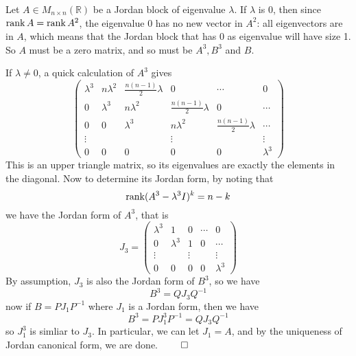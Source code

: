 \begin{enumerate}
    Let $A \in M_{n\times n}(\mathbb{R})$ be a Jordan block of eigenvalue $\lambda$. 
    If $\lambda$ is $0$, then since $\operatorname{rank} A = \operatorname{rank} A^2$, the eigenvalue 0 has no new vector in $A^2$: all eigenvectors are in $A$, which means that the Jordan block that has 0 as eigenvalue will have size 1. So $A$ must be a zero matrix, and so must be $A^3, B^3$ and $B$.

    If $\lambda \neq 0$, a quick calculation of $A^3$ gives 
    \[
    \begin{pmatrix}
        \lambda^3 & n \lambda^2 & \frac{n(n-1)}{2} \lambda & 0 & \cdots & 0  \\
        0 & \lambda^3 & n \lambda^2 & \frac{n(n-1)}{2} \lambda & 0 & \cdots   \\
        0 & 0 & \lambda^3 & n \lambda^2 & \frac{n(n-1)}{2} \lambda &  \cdots   \\
        \vdots & & &\vdots & & \vdots \\
        0 & 0& 0& 0& 0& \lambda^3 
    \end{pmatrix}	
    \]
    This is an upper triangle matrix, so its eigenvalues are exactly the elements in the diagonal. Now to determine its Jordan form, by noting that 
    \[
    \operatorname{rank} (A^3 - \lambda^3I)^k = n - k	
    \]
    we have the Jordan form of $A^3$, that is 
    \[ J_3 = 
    \begin{pmatrix}
        \lambda^3 & 1 & 0  & \cdots & 0  \\
        0 & \lambda^3 & 1 & 0  & \cdots   \\
        \vdots & &\vdots & & \vdots \\
        0 & 0& 0& 0& \lambda^3 
    \end{pmatrix}
    \]
    By assumption, $J_3$ is also the Jordan form of $B^3$, so we have
    \[
    B^3 = QJ_3Q^{-1}	
    \]
    now if $B = PJ_1P^{-1}$ where $J_1$ is a Jordan form, then we have
    \[
    B^3 = PJ_1^3P^{-1} = QJ_3Q^{-1}
    \]
    so $J_1^3$ is simliar to $J_3$. In particular, we can let $J_1 = A$, and by the uniqueness of Jordan canonical form, we are done. $\qed$


\end{enumerate}
